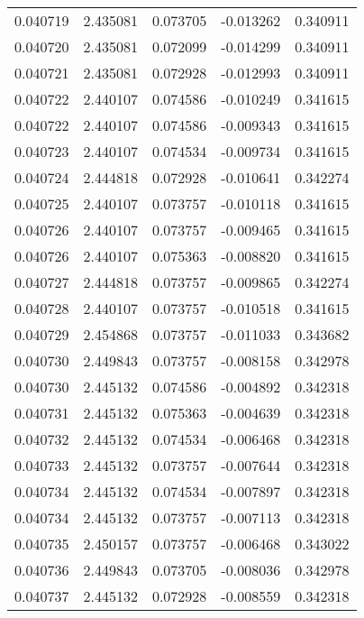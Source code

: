 \begin{tabular}{lrrrr}
0.040719    &  2.435081 &  0.073705 & -0.013262 &             0.340911 \\
0.040720    &  2.435081 &  0.072099 & -0.014299 &             0.340911 \\
0.040721    &  2.435081 &  0.072928 & -0.012993 &             0.340911 \\
0.040722    &  2.440107 &  0.074586 & -0.010249 &             0.341615 \\
0.040722    &  2.440107 &  0.074586 & -0.009343 &             0.341615 \\
0.040723    &  2.440107 &  0.074534 & -0.009734 &             0.341615 \\
0.040724    &  2.444818 &  0.072928 & -0.010641 &             0.342274 \\
0.040725    &  2.440107 &  0.073757 & -0.010118 &             0.341615 \\
0.040726    &  2.440107 &  0.073757 & -0.009465 &             0.341615 \\
0.040726    &  2.440107 &  0.075363 & -0.008820 &             0.341615 \\
0.040727    &  2.444818 &  0.073757 & -0.009865 &             0.342274 \\
0.040728    &  2.440107 &  0.073757 & -0.010518 &             0.341615 \\
0.040729    &  2.454868 &  0.073757 & -0.011033 &             0.343682 \\
0.040730    &  2.449843 &  0.073757 & -0.008158 &             0.342978 \\
0.040730    &  2.445132 &  0.074586 & -0.004892 &             0.342318 \\
0.040731    &  2.445132 &  0.075363 & -0.004639 &             0.342318 \\
0.040732    &  2.445132 &  0.074534 & -0.006468 &             0.342318 \\
0.040733    &  2.445132 &  0.073757 & -0.007644 &             0.342318 \\
0.040734    &  2.445132 &  0.074534 & -0.007897 &             0.342318 \\
0.040734    &  2.445132 &  0.073757 & -0.007113 &             0.342318 \\
0.040735    &  2.450157 &  0.073757 & -0.006468 &             0.343022 \\
0.040736    &  2.449843 &  0.073705 & -0.008036 &             0.342978 \\
0.040737    &  2.445132 &  0.072928 & -0.008559 &             0.342318 \\

\end{tabular}
